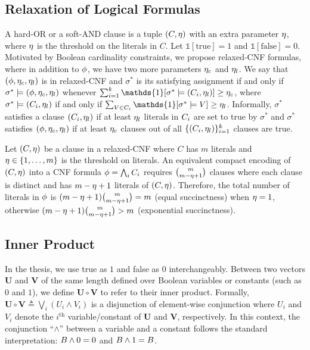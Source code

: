 \subsection{Relaxation of Logical Formulas}

A hard-OR or a soft-AND clause is a tuple $ (C,\eta) $ with an extra parameter $ \eta $, where $ \eta $ is the threshold on the literals in $ C $. Let $ \mathds{1}[\text{true}]=1 $ and $ \mathds{1}[\text{false}]=0 $. Motivated by Boolean cardinality constraints, we propose relaxed-CNF formulas, where in addition to $\phi$, we have two more parameters $\eta_c$ and $\eta_l$. We say that $(\phi,\eta_c, \eta_l)$ is in relaxed-CNF and $ \sigma^* $ is its satisfying assignment if and only if $\sigma^* \models (\phi,\eta_c, \eta_l)$ whenever $\sum_{i=1}^k \mathds{1}[\sigma^* \models (\propclause_i,\card_l)] \ge \card_c$, where $\sigma^* \models (C_i, \eta_l)$ if and only if $\sum_{V \in \propclause_i} \mathds{1}[\sigma^* \models V] \geq \card_l$. Informally,  $\sigma^*$ satisfies a clause $(C_i, \eta_l)$ if  at least $\eta_l$ literals in $C_i$ are set to true by $\sigma^*$ and $\sigma^*$ satisfies $(\phi,\eta_c, \eta_l)$ if at least $\eta_c$  clauses out of all $\{(C_i,\eta_l)\}_{i=1}^k$ clauses are true. 


\begin{theorem}
	\label{interpretability_crr_thm:succinctness}	
	Let $ (C,\eta) $ be a clause in a relaxed-CNF where  $ C $ has $ m  $ literals and $ \eta \in \{1,\dots,m\} $ is the threshold on literals.  An equivalent compact encoding of $ (C,\eta) $  into a CNF formula $ \phi= \bigwedge_i C_i $ requires $ {\binom{m}{m-\eta+1}} $  clauses where each clause is distinct and has $ m-\eta+1 $ literals of $ (C,\eta) $. Therefore,  the total number of literals in $ \phi $ is $ (m-\eta+1){\binom{m}{m-\eta+1}} = m $ (equal succinctness) when $ \eta=1 $, otherwise $ (m-\eta+1){\binom{m}{m-\eta+1}} > m $ (exponential succinctness).
\end{theorem}


\subsection{Inner Product}
In the thesis, we use true as $ 1 $ and false as $ 0 $ interchangeably. Between two vectors  $\mathbf{U}$ and $\mathbf{V}$ of the same length defined over Boolean variables or constants (such as  $ 0 $ and $ 1 $), we define $\mathbf{U} \circ \mathbf{V} $  to refer to  their inner product. Formally, $\mathbf{U} \circ \mathbf{V} \triangleq \bigvee_{i} (U_{i} \wedge V_{i})$ is a disjunction of element-wise conjunction where $U_{i}$ and $V_{i}$ denote the $ i^\text{th} $ variable/constant of $\mathbf{U}$ and $\mathbf{V}$, respectively. In this context, the conjunction ``$\wedge$'' between a variable and a constant follows the standard interpretation: $B \wedge 0 = 0$ and $B \wedge 1 = B$.  

